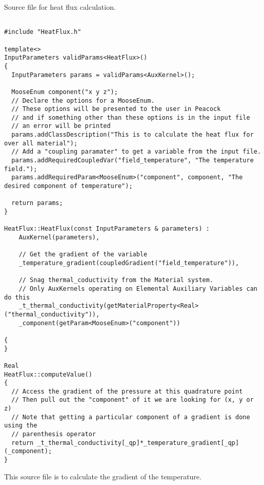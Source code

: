 Source file for heat flux calculation.
\lstset{style=cpp}
\begin{lstlisting}

#include "HeatFlux.h"

template<>
InputParameters validParams<HeatFlux>()
{
  InputParameters params = validParams<AuxKernel>();

  MooseEnum component("x y z");
  // Declare the options for a MooseEnum.
  // These options will be presented to the user in Peacock
  // and if something other than these options is in the input file
  // an error will be printed
  params.addClassDescription("This is to calculate the heat flux for over all material");
  // Add a "coupling paramater" to get a variable from the input file.
  params.addRequiredCoupledVar("field_temperature", "The temperature field.");
  params.addRequiredParam<MooseEnum>("component", component, "The desired component of temperature");

  return params;
}

HeatFlux::HeatFlux(const InputParameters & parameters) :
    AuxKernel(parameters),

    // Get the gradient of the variable
    _temperature_gradient(coupledGradient("field_temperature")),

    // Snag thermal_coductivity from the Material system.
    // Only AuxKernels operating on Elemental Auxiliary Variables can do this
    _t_thermal_conductivity(getMaterialProperty<Real>("thermal_conductivity")),
	_component(getParam<MooseEnum>("component"))

{
}

Real
HeatFlux::computeValue()
{
  // Access the gradient of the pressure at this quadrature point
  // Then pull out the "component" of it we are looking for (x, y or z)
  // Note that getting a particular component of a gradient is done using the
  // parenthesis operator
  return _t_thermal_conductivity[_qp]*_temperature_gradient[_qp](_component);
}
\end{lstlisting}
This source file is to calculate the gradient of the temperature.
\lstset{style=cpp}
